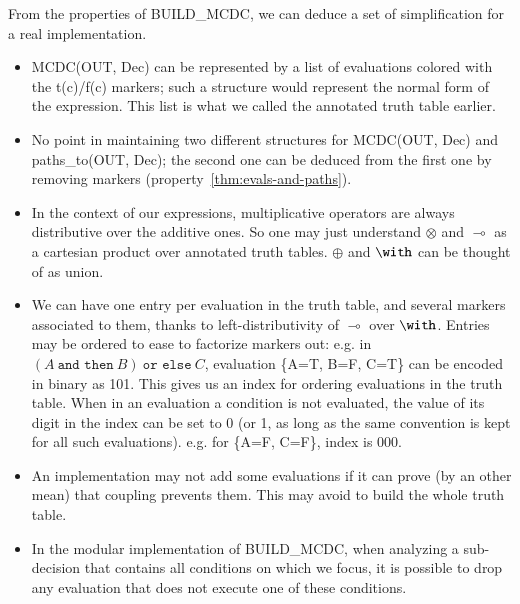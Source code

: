 \documentclass[a4paper,12pt,twoside]{article}
\newcommand{\andthen}{\texttt{and then}}
\newcommand{\orelse}{\texttt{or else}}
\begin{document}
From the properties of BUILD\_MCDC, we can deduce a set of
simplification for a real implementation.

\begin{itemize}
\item MCDC(OUT, Dec) can be represented by a list of evaluations
colored with the t(c)/f(c) markers; such a structure would represent
the normal form of the expression. This list is what we called the
annotated truth table earlier.

\item No point in maintaining two different structures for MCDC(OUT, Dec) and
paths\_to(OUT, Dec); the second one can be deduced from the first one by
removing markers (property~\ref{thm:evals-and-paths}).

\item In the context of our expressions, multiplicative operators are
always distributive over the additive ones. So one may just understand
$\otimes$ and $\multimap$ as a cartesian product over annotated truth tables.
$\oplus$ and $\with$ can be thought of as union.

\item We can have one entry per evaluation in the truth table, and several
markers associated to them, thanks to left-distributivity of $\multimap$ over
$\with$. Entries may be ordered to ease to factorize markers out:
e.g. in $(A \ \andthen{} \ B) \ \orelse{} \ C$, evaluation \{A=T, B=F, C=T\}
can be encoded in binary as 101. This gives us an index for ordering
evaluations in the truth table. When in an evaluation a condition is
not evaluated, the value of its digit in the index can be set to
0 (or 1, as long as the same convention is kept for all such evaluations).
e.g. for \{A=F, C=F\}, index is 000.

\item An implementation may not add some evaluations if it can prove (by
an other mean) that coupling prevents them. This may avoid to build
the whole truth table.

\item In the modular implementation of BUILD\_MCDC, when analyzing a
sub-decision that contains all conditions on which we focus, it is
possible to drop any evaluation that does not execute one of these
conditions.
\end{itemize}

\newpage


\end{document}
